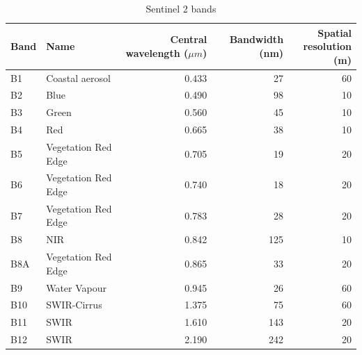 \documentclass[11pt, a4paper]{article}
\begin{document}
	\begin{table}[H]
		\centering
		\caption{Sentinel 2 bands}
		\label{tab:sentinel2-bands}
		\begin{tabular}{llrrr}
			\hline
			Band & Name                & \parbox{3cm}{\centering \vspace{0.5cm} Central \\ wavelength ($\mu m$) \\ \hspace{0.1cm}} & Bandwidth (nm) & \parbox{3cm}{\centering Spatial\\ resolution (m)} \\ \hline
			B1   & Coastal aerosol     &                      $0.433$ &             27 &                     60 \\
			B2   & Blue                &                        0.490 &             98 &                     10 \\
			B3   & Green               &                        0.560 &             45 &                     10 \\
			B4   & Red                 &                        0.665 &             38 &                     10 \\
			B5   & Vegetation Red Edge &                        0.705 &             19 &                     20 \\
			B6   & Vegetation Red Edge &                        0.740 &             18 &                     20 \\
			B7   & Vegetation Red Edge &                        0.783 &             28 &                     20 \\
			B8   & NIR                 &                        0.842 &            125 &                     10 \\
			B8A  & Vegetation Red Edge &                        0.865 &             33 &                     20 \\
			B9   & Water Vapour        &                        0.945 &             26 &                     60 \\
			B10  & SWIR-Cirrus         &                        1.375 &             75 &                     60 \\
			B11  & SWIR                &                        1.610 &            143 &                     20 \\
			B12  & SWIR                &                        2.190 &            242 &                     20\\\hline
		\end{tabular}
	\end{table}
\end{document}
